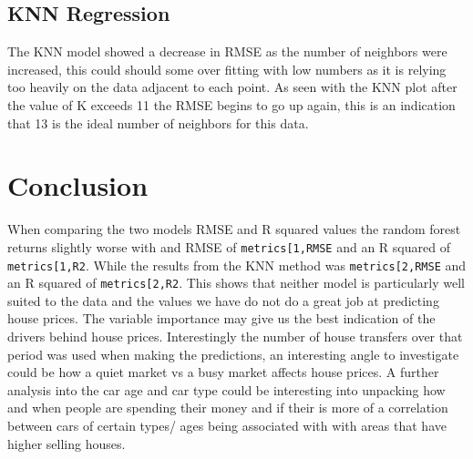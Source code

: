\documentclass[
]{article}
\begin{document}
\hypertarget{knn-regression}{%
\subsection{KNN Regression}\label{knn-regression}}

The KNN model showed a decrease in RMSE as the number of neighbors were
increased, this could should some over fitting with low numbers as it is
relying too heavily on the data adjacent to each point. As seen with the
KNN plot after the value of K exceeds 11 the RMSE begins to go up again,
this is an indication that 13 is the ideal number of neighbors for this
data.

\hypertarget{conclusion}{%
\section{Conclusion}\label{conclusion}}

When comparing the two models RMSE and R squared values the random
forest returns slightly worse with and RMSE of
\texttt{metrics{[}1,\textquotesingle{}RMSE\textquotesingle{}{]}} and an
R squared of
\texttt{metrics{[}1,\textquotesingle{}R2\textquotesingle{}{]}}. While
the results from the KNN method was
\texttt{metrics{[}2,\textquotesingle{}RMSE\textquotesingle{}{]}} and an
R squared of
\texttt{metrics{[}2,\textquotesingle{}R2\textquotesingle{}{]}}. This
shows that neither model is particularly well suited to the data and the
values we have do not do a great job at predicting house prices. The
variable importance may give us the best indication of the drivers
behind house prices. Interestingly the number of house transfers over
that period was used when making the predictions, an interesting angle
to investigate could be how a quiet market vs a busy market affects
house prices. A further analysis into the car age and car type could be
interesting into unpacking how and when people are spending their money
and if their is more of a correlation between cars of certain types/
ages being associated with with areas that have higher selling houses.
\end{document}
